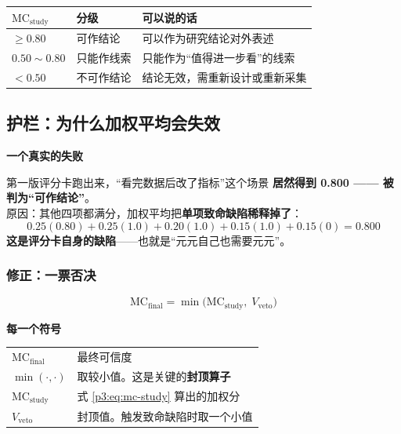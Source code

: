 \documentclass[UTF8,a4paper,11pt]{ctexart}
\newenvironment{explainbox}[1]
{\begin{center}\begin{minipage}{0.94\textwidth}\colorbox{boxbg}{\parbox{0.92\textwidth}{\textbf{#1}\par\vspace{2pt}}}}
{\end{minipage}\end{center}}
\begin{document}
\begin{center}
\begin{tabular}{p{4.2cm}p{3.0cm}p{7.2cm}}
\toprule
$\text{MC}_{\text{study}}$ & \textbf{分级} & \textbf{可以说的话} \\
\midrule
$\ge 0.80$ & 可作结论 & 可以作为研究结论对外表述 \\
$0.50 \sim 0.80$ & 只能作线索 & 只能作为“值得进一步看”的线索 \\
$< 0.50$ & 不可作结论 & 结论无效，需重新设计或重新采集 \\
\bottomrule
\end{tabular}
\end{center}

\subsection{护栏：为什么加权平均会失效}

\begin{explainbox}{一个真实的失败}
第一版评分卡跑出来，“看完数据后改了指标”这个场景
\textbf{居然得到 0.800 —— 被判为“可作结论”}。\\[4pt]
原因：其他四项都满分，加权平均把\textbf{单项致命缺陷稀释掉了}：
\begin{equation}
0.25(0.80) + 0.25(1.0) + 0.20(1.0) + 0.15(1.0) + 0.15(0) = 0.800
\end{equation}
\textbf{这是评分卡自身的缺陷}——也就是“元元自己也需要元元”。
\end{explainbox}

\subsubsection{修正：一票否决}

\begin{equation}
\text{MC}_{\text{final}} = \min\Big(\text{MC}_{\text{study}},\; V_{\text{veto}}\Big)
\label{p3:eq:veto}
\end{equation}

\begin{explainbox}{每一个符号}
\begin{longtable}{@{}p{3.0cm}p{10.8cm}@{}}
$\text{MC}_{\text{final}}$ & 最终可信度 \\
$\min(\cdot,\cdot)$ & 取较小值。这是关键的\textbf{封顶算子} \\
$\text{MC}_{\text{study}}$ & 式 \eqref{p3:eq:mc-study} 算出的加权分 \\
$V_{\text{veto}}$ & 封顶值。触发致命缺陷时取一个小值 \\
\end{longtable}
\end{explainbox}
\end{document}
